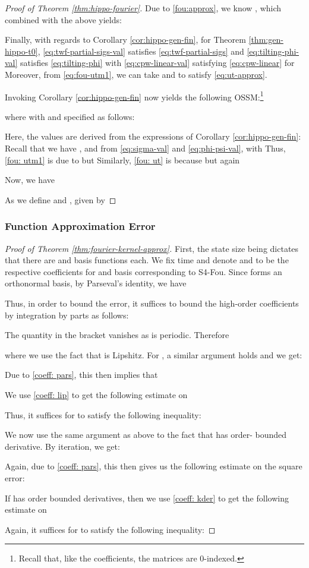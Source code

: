 \documentclass{article}
\begin{document}
\begin{proof}[Proof of Theorem \ref{thm:hippo-fourier}]
Due to \eqref{fou:approx}, we know , which combined with the above yields:

    
Finally, with regards to Corollary  \ref{cor:hippo-gen-fin}, for Theorem \ref{thm:gen-hippo-t0}, \eqref{eq:twf-partial-sigs-val} satisfies \eqref{eq:twf-partial-sigs} and \eqref{eq:tilting-phi-val} satisfies \eqref{eq:tilting-phi} with \eqref{eq:cpw-linear-val} satisfying \eqref{eq:cpw-linear} for  Moreover, from \eqref{eq:fou-utm1}, we can take  and  to satisfy \eqref{eq:ut-approx}.

Invoking Corollary \ref{cor:hippo-gen-fin} now yields the following OSSM:\footnote{
Recall that, like the coefficients, the matrices are 0-indexed.}
  
 where  with  and  specified as follows:

Here, the values are derived from the expressions of  Corollary \ref{cor:hippo-gen-fin}:  Recall that we have , and from \eqref{eq:sigma-val} and \eqref{eq:phi-psi-val},  with  
 Thus, \eqref{fou: utm1} is due to  but   Similarly, \eqref{fou: ut} is because  but again 
 
 
Now, we have
 

As  we define  and , given by

\end{proof}


 \subsubsection{Function Approximation Error}
\begin{proof}[Proof of Theorem \ref{thm:fourier-kernel-approx}]
First, the state size being  dictates that there are   and  basis functions each. We fix time  and denote  and  to be the respective coefficients for  and  basis corresponding to S4-Fou. Since  forms an orthonormal basis, by Parseval's identity, we have

Thus, in order to bound the error, it suffices to bound the high-order coefficients by integration by parts as follows:

The quantity in the bracket vanishes as  is periodic. Therefore

where we use the fact that  is Lipshitz. 
For , a similar argument holds and we get:

Due to \eqref{coeff: pars}, this then implies that 

We use \eqref{coeff: lip} to get the following estimate on 

Thus, it suffices for  to satisfy the following inequality:



We now use the same argument as above to the fact that  has order- bounded derivative. By iteration, we get: 

Again, due to \eqref{coeff: pars}, this then gives us the following estimate on the square error:

If  has order bounded derivatives, then we use \eqref{coeff: kder} to get the following estimate on 

Again, it suffices for  to satisfy the following inequality:

\end{proof}
 
\end{document}
